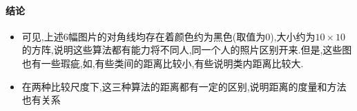 %
%
%
%
%
%
%
%
\paragraph{结论}
\begin{itemize}
	\item 可见,上述6幅图片的对角线均存在着颜色约为黑色(取值为0),大小约为$10 \times 10$的方阵,说明这些算法都有能力将不同人,同一个人的照片区别开来.但是,这些图也有一些瑕疵,如,有些类间的距离比较小,有些说明类内距离比较大.
	\item 在两种比较尺度下,这三种算法的距离都有一定的区别,说明距离的度量和方法也有关系
\end{itemize}

